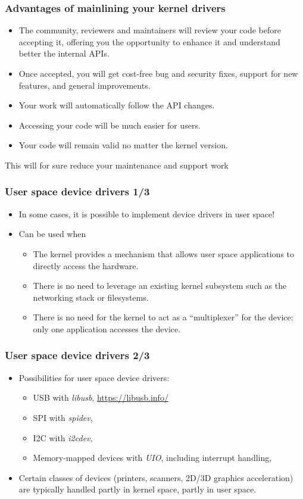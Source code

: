 \begin{frame}
  \frametitle{Advantages of mainlining your kernel drivers}
  \begin{itemize}
  \item The community, reviewers and maintainers will review your code
    before accepting it, offering you the opportunity to enhance it and
    understand better the internal APIs.
  \item Once accepted, you will get cost-free bug and security fixes,
    support for new features, and general improvements.
  \item Your work will automatically follow the API changes.
  \item Accessing your code will be much easier for users.
  \item Your code will remain valid no matter the kernel version.
  \end{itemize}
  This will for sure reduce your maintenance and support work
\end{frame}

\begin{frame}
  \frametitle{User space device drivers 1/3}
  \begin{itemize}
  \item In some cases, it is possible to implement device drivers in
    user space!
  \item Can be used when
    \begin{itemize}
    \item The kernel provides a mechanism that allows user space
      applications to directly access the hardware.
    \item There is no need to leverage an existing kernel subsystem
      such as the networking stack or filesystems.
    \item There is no need for the kernel to act as a ``multiplexer''
      for the device: only one application accesses the device.
    \end{itemize}
  \end{itemize}
\end{frame}

\begin{frame}
  \frametitle{User space device drivers 2/3}
  \begin{itemize}
  \item Possibilities for user space device drivers:
    \begin{itemize}
    \item USB with {\em libusb}, \url{https://libusb.info/}
    \item SPI with {\em spidev}, 
    \item I2C with {\em i2cdev}, 
    \item Memory-mapped devices with {\em UIO}, including interrupt
      handling, 
    \end{itemize}
  \item Certain classes of devices (printers, scanners, 2D/3D graphics
    acceleration) are typically handled partly in kernel space, partly
    in user space.
  \end{itemize}
\end{frame}

